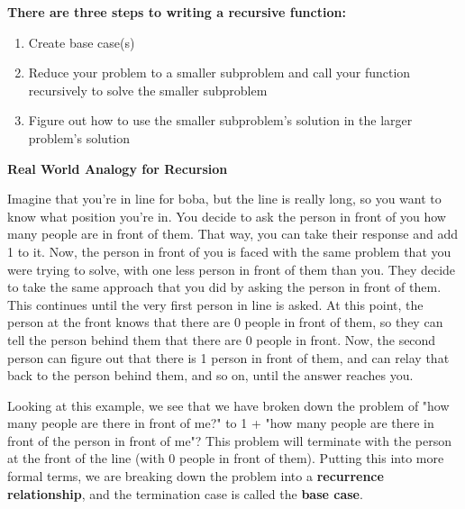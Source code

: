 \begin{blocksection}
\textbf{There are three steps to writing a recursive function:}
\begin{enumerate}
    \item Create base case(s)
    \item Reduce your problem to a smaller subproblem and call your function recursively to solve the smaller subproblem
    \item Figure out how to use the smaller subproblem's solution in the larger problem's solution
\end{enumerate}

\vspace{3mm}

\textbf{Real World Analogy for Recursion}


Imagine that you're in line for boba, but the line is really long, so you want to know what position you're in. You decide to ask the person in front of you how many people are in front of them. That way, you can take their response and add 1 to it. Now, the person in front of you is faced with the same problem that you were trying to solve, with one less person in front of them than you. They decide to take the same approach that you did by asking the person in front of them. This continues until the very first person in line is asked. At this point, the person at the front knows that there are 0 people in front of them, so they can tell the person behind them that there are 0 people in front. Now, the second person can figure out that there is 1 person in front of them, and can relay that back to the person behind them, and so on, until the answer reaches you.


Looking at this example, we see that we have broken down the problem of "how many people are there in front of me?" to 1 + "how many people are there in front of the person in front of me"? This problem will terminate with the person at the front of the line (with 0 people in front of them). Putting this into more formal terms, we are breaking down the problem into a \textbf{recurrence relationship}, and the termination case is called the \textbf{base case}.
\end{blocksection}

